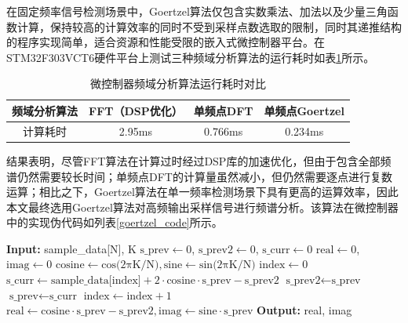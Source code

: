 在固定频率信号检测场景中，Goertzel算法仅包含实数乘法、加法以及少量三角函数计算，保持较高的计算效率的同时不受到采样点数选取的限制，同时其递推结构的程序实现简单，适合资源和性能受限的嵌入式微控制器平台。在STM32F303VCT6硬件平台上测试三种频域分析算法的运行耗时如表\ref{efficence}所示。
\begin{table}[htbp]
	\caption{\label{efficence}微控制器频域分析算法运行耗时对比}
	\centering
	\small
	\setlength{\tabcolsep}{10pt}
	\begin{tabular}{c c c c }
		\hline
		频域分析算法 & FFT（DSP优化） & 单频点DFT  & 单频点Goertzel \\
		\hline
		计算耗时   & 2.95ms     & 0.766ms & 0.234ms     \\
		\hline
	\end{tabular}
\end{table}
结果表明，尽管FFT算法在计算过时经过DSP库的加速优化，但由于包含全部频谱仍然需要较长时间；单频点DFT的计算量虽然减小，但仍然需要逐点进行复数运算；相比之下，Goertzel算法在单一频率检测场景下具有更高的运算效率，因此本文最终选用Goertzel算法对高频输出采样信号进行频谱分析。该算法在微控制器中的实现伪代码如列表\ref{goertzel_code}所示。
\begin{algorithm}
	\caption{Goertzel算法实现伪代码}
	\label{goertzel_code}
	\begin{algorithmic}[1]
		\setlength{\baselineskip}{16pt} %
		\State \textbf{Input:} sample\_data[N], K
		\State $\text{s\_prev} \gets 0$, $\text{s\_prev2} \gets 0$, $\text{s\_curr} \gets 0$
		\State $\text{real} \gets 0$, $\text{imag} \gets 0$
		\State $\text{cosine} \gets \text{cos(2πK/N)}, \text{sine} \gets \text{sin(2πK/N)}$
		\State $\text{index} \gets 0$
		\State $\text{s\_curr} \gets \text{sample\_data[index]} + 2\cdot \text{cosine} \cdot \text{s\_prev} - \text{s\_prev2}$
		\State $\text{s\_prev2} \gets \text{s\_prev}$
		\State $\text{s\_prev} \gets \text{s\_curr}$
		\State $\text{index} \gets \text{index} + 1$
		\EndWhile
		\State $\text{real} \gets \text{cosine} \cdot \text{s\_prev} - \text{s\_prev2}, \text{imag} \gets \text{sine} \cdot \text{s\_prev}$
		\State \textbf{Output:} real, imag
	\end{algorithmic}
\end{algorithm}

